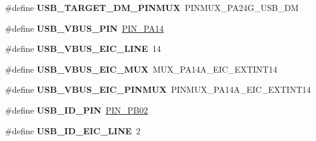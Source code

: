 \begin{DoxyCompactItemize}
\item 
\hypertarget{group__saml21__xplained__pro__features__group_ga3590903d24923c02d7c5560ce1e11939}{}\#define {\bfseries U\+S\+B\+\_\+\+T\+A\+R\+G\+E\+T\+\_\+\+D\+M\+\_\+\+P\+I\+N\+M\+U\+X}~P\+I\+N\+M\+U\+X\+\_\+\+P\+A24\+G\+\_\+\+U\+S\+B\+\_\+\+D\+M\label{group__saml21__xplained__pro__features__group_ga3590903d24923c02d7c5560ce1e11939}

\item 
\hypertarget{group__saml21__xplained__pro__features__group_ga5e087011ca814d14f4a42be3b9621e1c}{}\#define {\bfseries U\+S\+B\+\_\+\+V\+B\+U\+S\+\_\+\+P\+I\+N}~\hyperlink{pio_2saml21j18a_8h_ad71083de279943a97f0a159c824c290b}{P\+I\+N\+\_\+\+P\+A14}\label{group__saml21__xplained__pro__features__group_ga5e087011ca814d14f4a42be3b9621e1c}

\item 
\hypertarget{group__saml21__xplained__pro__features__group_ga8059afaf0b2d03579635acc08740299e}{}\#define {\bfseries U\+S\+B\+\_\+\+V\+B\+U\+S\+\_\+\+E\+I\+C\+\_\+\+L\+I\+N\+E}~14\label{group__saml21__xplained__pro__features__group_ga8059afaf0b2d03579635acc08740299e}

\item 
\hypertarget{group__saml21__xplained__pro__features__group_gacf465ba3dac5d96582bdb94d7b826d12}{}\#define {\bfseries U\+S\+B\+\_\+\+V\+B\+U\+S\+\_\+\+E\+I\+C\+\_\+\+M\+U\+X}~M\+U\+X\+\_\+\+P\+A14\+A\+\_\+\+E\+I\+C\+\_\+\+E\+X\+T\+I\+N\+T14\label{group__saml21__xplained__pro__features__group_gacf465ba3dac5d96582bdb94d7b826d12}

\item 
\hypertarget{group__saml21__xplained__pro__features__group_ga2582d6c6524bdd643b5982b664fc15b1}{}\#define {\bfseries U\+S\+B\+\_\+\+V\+B\+U\+S\+\_\+\+E\+I\+C\+\_\+\+P\+I\+N\+M\+U\+X}~P\+I\+N\+M\+U\+X\+\_\+\+P\+A14\+A\+\_\+\+E\+I\+C\+\_\+\+E\+X\+T\+I\+N\+T14\label{group__saml21__xplained__pro__features__group_ga2582d6c6524bdd643b5982b664fc15b1}

\item 
\hypertarget{group__saml21__xplained__pro__features__group_ga4b602bd00c1d882e9f0f602f1ef49c3c}{}\#define {\bfseries U\+S\+B\+\_\+\+I\+D\+\_\+\+P\+I\+N}~\hyperlink{pio_2saml21j18a_8h_a19ef30fcec1b8ad27ff954975a005850}{P\+I\+N\+\_\+\+P\+B02}\label{group__saml21__xplained__pro__features__group_ga4b602bd00c1d882e9f0f602f1ef49c3c}

\item 
\hypertarget{group__saml21__xplained__pro__features__group_gabc97d0dc35b2b137316fe7533b216147}{}\#define {\bfseries U\+S\+B\+\_\+\+I\+D\+\_\+\+E\+I\+C\+\_\+\+L\+I\+N\+E}~2\label{group__saml21__xplained__pro__features__group_gabc97d0dc35b2b137316fe7533b216147}


\end{DoxyCompactItemize}
